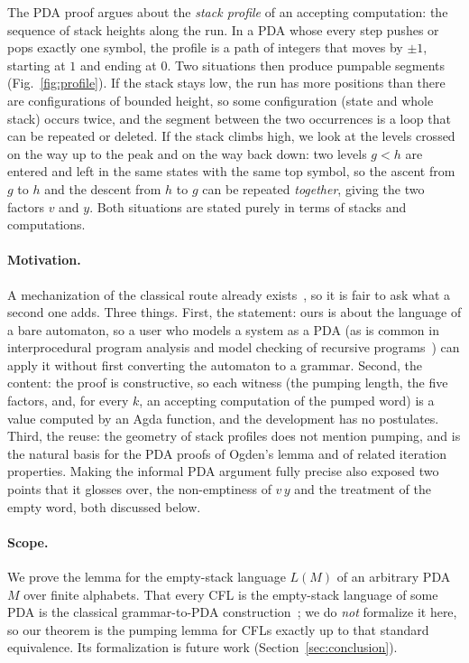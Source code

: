 \documentclass[runningheads]{llncs}
\begin{document}
The PDA proof argues about the \emph{stack profile} of an accepting
computation: the sequence of stack heights along the run. In a PDA whose every
step pushes or pops exactly one symbol, the profile is a path of integers that
moves by $\pm 1$, starting at $1$ and ending at $0$. Two situations then produce
pumpable segments (Fig.~\ref{fig:profile}). If the stack stays low, the run has
more positions than there are configurations of bounded height, so some
configuration (state and whole stack) occurs twice, and the segment between the
two occurrences is a loop that can be repeated or deleted. If the stack climbs
high, we look at the levels crossed on the way up to the peak and on the way
back down: two levels $g < h$ are entered and left in the same states with the
same top symbol, so the ascent from $g$ to $h$ and the descent from $h$ to $g$
can be repeated \emph{together}, giving the two factors $v$ and $y$. Both
situations are stated purely in terms of stacks and computations.

\paragraph{Motivation.}
A mechanization of the classical route already exists~\cite{RamosPumping16}, so
it is fair to ask what a second one adds. Three things. First, the statement:
ours is about the language of a bare automaton, so a user who models a system as
a PDA (as is common in interprocedural program analysis and model checking of
recursive programs~\cite{Reps98,AlurMadhusudan04}) can apply it without first
converting the automaton to a grammar. Second, the content: the proof is
constructive, so each witness (the pumping length, the five factors, and, for
every $k$, an accepting computation of the pumped word) is a value computed by
an Agda function, and the development has no postulates. Third, the reuse: the
geometry of stack profiles does not mention pumping, and is the natural basis for
the PDA proofs of Ogden's lemma and of related iteration properties. Making the
informal PDA argument fully precise also exposed two points that it glosses
over, the non-emptiness of $v\,y$ and the treatment of the empty word, both
discussed below.

\paragraph{Scope.}
We prove the lemma for the empty-stack language $L(M)$ of an arbitrary PDA $M$
over finite alphabets. That every CFL is the empty-stack language of some PDA is
the classical grammar-to-PDA construction~\cite{hopcroft06}; we do \emph{not}
formalize it here, so our theorem is the pumping lemma for CFLs exactly up to
that standard equivalence. Its formalization is future work
(Section~\ref{sec:conclusion}).
\end{document}

